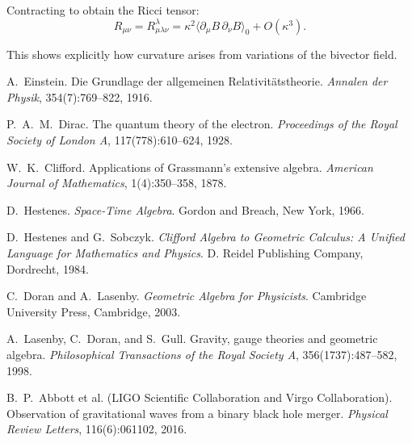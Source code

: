 \documentclass[11pt,a4paper]{article}
\numberwithin{equation}{section}
\theoremstyle{plain}
\theoremstyle{definition}
\theoremstyle{remark}
\begin{document}
Contracting to obtain the Ricci tensor:
\begin{equation}
R_{\mu\nu} = R^\lambda_{\mu\lambda\nu} = \kappa^2 \langle \partial_\mu B \, \partial_\nu B \rangle_0 + O(\kappa^3).
\end{equation}

This shows explicitly how curvature arises from variations of the bivector field.


\begin{thebibliography}{9}

A.~Einstein.
\newblock Die Grundlage der allgemeinen Relativitätstheorie.
\newblock \emph{Annalen der Physik}, 354(7):769--822, 1916.

P.~A.~M.~Dirac.
\newblock The quantum theory of the electron.
\newblock \emph{Proceedings of the Royal Society of London A}, 117(778):610--624, 1928.

W.~K.~Clifford.
\newblock Applications of Grassmann's extensive algebra.
\newblock \emph{American Journal of Mathematics}, 1(4):350--358, 1878.

D.~Hestenes.
\newblock \emph{Space-Time Algebra}.
\newblock Gordon and Breach, New York, 1966.

D.~Hestenes and G.~Sobczyk.
\newblock \emph{Clifford Algebra to Geometric Calculus: A Unified Language for Mathematics and Physics}.
\newblock D. Reidel Publishing Company, Dordrecht, 1984.

C.~Doran and A.~Lasenby.
\newblock \emph{Geometric Algebra for Physicists}.
\newblock Cambridge University Press, Cambridge, 2003.

A.~Lasenby, C.~Doran, and S.~Gull.
\newblock Gravity, gauge theories and geometric algebra.
\newblock \emph{Philosophical Transactions of the Royal Society A}, 356(1737):487--582, 1998.

B.~P.~Abbott et al. (LIGO Scientific Collaboration and Virgo Collaboration).
\newblock Observation of gravitational waves from a binary black hole merger.
\newblock \emph{Physical Review Letters}, 116(6):061102, 2016.

\end{thebibliography}
\end{document}
